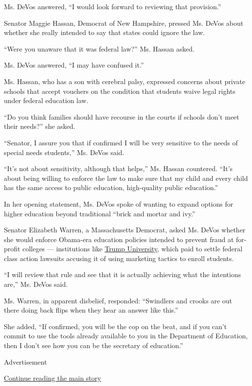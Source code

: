 Ms. DeVos answered, ``I would look forward to reviewing that
provision.''

Senator Maggie Hassan, Democrat of New Hampshire, pressed Ms. DeVos
about whether she really intended to say that states could ignore the
law.

``Were you unaware that it was federal law?'' Ms. Hassan asked.

Ms. DeVos answered, ``I may have confused it.''

Ms. Hassan, who has a son with cerebral palsy, expressed concerns about
private schools that accept vouchers on the condition that students
waive legal rights under federal education law.

``Do you think families should have recourse in the courts if schools
don't meet their needs?'' she asked.

``Senator, I assure you that if confirmed I will be very sensitive to
the needs of special needs students,'' Ms. DeVos said.

``It's not about sensitivity, although that helps,'' Ms. Hassan
countered. ``It's about being willing to enforce the law to make sure
that my child and every child has the same access to public education,
high-quality public education.''

In her opening statement, Ms. DeVos spoke of wanting to expand options
for higher education beyond traditional ``brick and mortar and ivy.''

Senator Elizabeth Warren, a Massachusetts Democrat, asked Ms. DeVos
whether she would enforce Obama-era education policies intended to
prevent fraud at for-profit colleges --- institutions like
\href{https://www.nytimes.com/2016/11/19/us/politics/trump-university.html}{Trump
University}, which paid to settle federal class action lawsuits accusing
it of using marketing tactics to enroll students.

``I will review that rule and see that it is actually achieving what the
intentions are,'' Ms. DeVos said.

Ms. Warren, in apparent disbelief, responded: ``Swindlers and crooks are
out there doing back flips when they hear an answer like this.''

She added, ``If confirmed, you will be the cop on the beat, and if you
can't commit to use the tools already available to you in the Department
of Education, then I don't see how you can be the secretary of
education.''

Advertisement

\protect\hyperlink{after-bottom}{Continue reading the main story}

